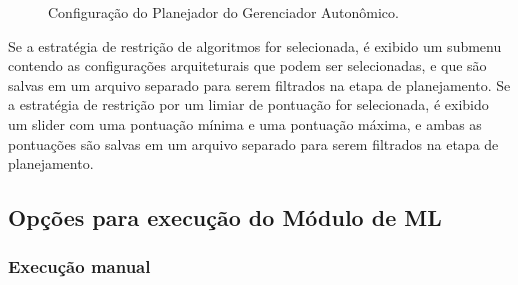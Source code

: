 \documentclass[Portugues,Final]{ic-tese-v3}
\begin{document}
\begin{figure}[H]
    \centering
    \caption{Configuração do Planejador do Gerenciador Autonômico.}
    \label{fig:configPlanejamento}
\end{figure}

Se a estratégia de restrição de algoritmos for selecionada, é exibido um submenu contendo as configurações arquiteturais que podem ser selecionadas, e que são salvas em um arquivo separado para serem filtrados na etapa de planejamento. Se a estratégia de restrição por um limiar de pontuação for selecionada, é exibido um slider com uma pontuação mínima e uma pontuação máxima, e ambas as pontuações são salvas em um arquivo separado para serem filtrados na etapa de planejamento.

\subsection{Opções para execução do Módulo de ML}

\subsubsection{Execução manual}
\end{document}
